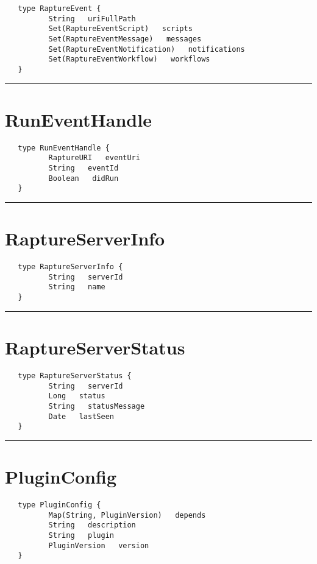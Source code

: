 \begin{verbatim}
   type RaptureEvent {
          String   uriFullPath
          Set(RaptureEventScript)   scripts
          Set(RaptureEventMessage)   messages
          Set(RaptureEventNotification)   notifications
          Set(RaptureEventWorkflow)   workflows
   }
\end{verbatim}

\rule{15cm}{2pt}
\section{RunEventHandle}
\label{type:RunEventHandle}

\begin{verbatim}
   type RunEventHandle {
          RaptureURI   eventUri
          String   eventId
          Boolean   didRun
   }
\end{verbatim}

\rule{15cm}{2pt}
\section{RaptureServerInfo}
\label{type:RaptureServerInfo}

\begin{verbatim}
   type RaptureServerInfo {
          String   serverId
          String   name
   }
\end{verbatim}

\rule{15cm}{2pt}
\section{RaptureServerStatus}
\label{type:RaptureServerStatus}

\begin{verbatim}
   type RaptureServerStatus {
          String   serverId
          Long   status
          String   statusMessage
          Date   lastSeen
   }
\end{verbatim}

\rule{15cm}{2pt}
\section{PluginConfig}
\label{type:PluginConfig}

\begin{verbatim}
   type PluginConfig {
          Map(String, PluginVersion)   depends
          String   description
          String   plugin
          PluginVersion   version
   }
\end{verbatim}

